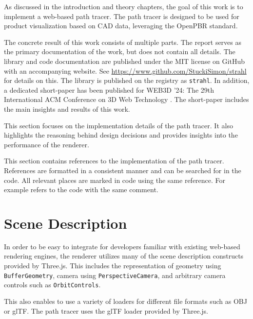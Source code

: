 
As discussed in the introduction and theory chapters, the goal of this work is to implement a web-based path tracer. The path tracer is designed to be used for product visualization based on CAD data, leveraging the \gls{OpenPBR} standard.

The concrete result of this work consists of multiple parts. The report serves as the primary documentation of the work, but does not contain all details. The library and code documentation are published under the MIT license on GitHub with an accompanying website. See \url{https://www.github.com/StuckiSimon/strahl} for details on this. The library is published on the  registry as \texttt{strahl}. In addition, a dedicated short-paper has been published for WEB3D '24: The 29th International ACM Conference on 3D Web Technology \cite{ownShortPaper}. The short-paper includes the main insights and results of this work.

This section focuses on the implementation details of the path tracer. It also highlights the reasoning behind design decisions and provides insights into the performance of the renderer.

This section contains references to the implementation of the path tracer. References are formatted in a consistent manner and can be searched for in the code. All relevant places are marked in code using the same reference. For example  refers to the code with the same comment.

\section{Scene Description}

In order to be easy to integrate for developers familiar with existing web-based rendering engines, the renderer utilizes many of the scene description constructs provided by \gls{Three.js}. This includes the representation of geometry using \texttt{BufferGeometry}, camera using \texttt{PerspectiveCamera}, and arbitrary camera controls such as \texttt{OrbitControls}.

This also enables to use a variety of loaders for different file formats such as \gls{OBJ} or \gls{glTF}. The path tracer uses the \gls{glTF} loader provided by \gls{Three.js}.

